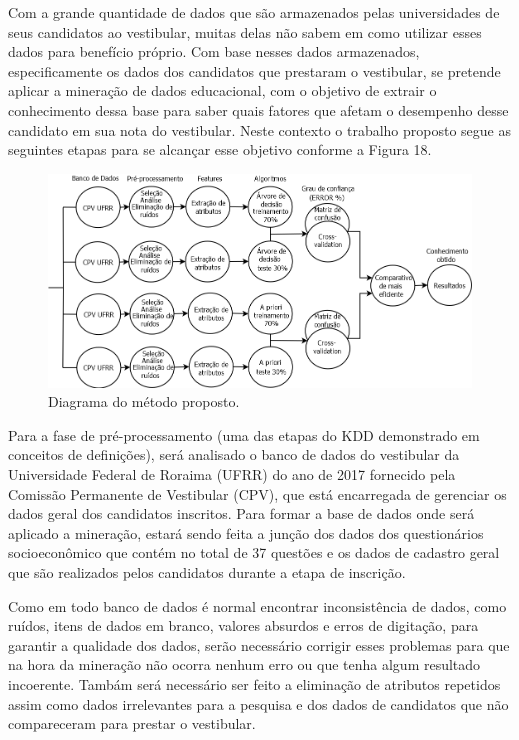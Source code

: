 \label{chapter:metodo}

\par
Com a grande quantidade de dados que são armazenados pelas universidades de seus candidatos ao vestibular, muitas delas não sabem em como utilizar esses dados para benefício próprio. Com base nesses dados armazenados, especificamente os dados dos candidatos que prestaram o vestibular, se pretende aplicar a mineração de dados educacional, com o objetivo de extrair o conhecimento dessa base para saber quais fatores que afetam o desempenho desse candidato em sua nota do vestibular. Neste contexto o trabalho proposto segue as seguintes etapas para se alcançar esse objetivo conforme a Figura 18.

\par
\begin{figure}[!htp]
	\begin{center}
    \caption{\label{fig:waveform_fig} Diagrama do método proposto.}
	\includegraphics[scale=0.45]{Figuras/Caso_de_uso_metodo_TCC1.png}
	\end{center}
\end{figure}

\par
Para a fase de pré-processamento (uma das etapas do KDD demonstrado em conceitos de definições), será analisado o banco de dados do vestibular da Universidade Federal de Roraima (UFRR) do ano de 2017 fornecido pela Comissão Permanente de Vestibular (CPV), que está encarregada de gerenciar os dados geral dos candidatos inscritos. Para formar a base de dados onde será aplicado a mineração, estará sendo feita a junção dos dados dos questionários socioeconômico que contém no total de 37 questões e os dados de cadastro geral que são realizados pelos candidatos durante a etapa de inscrição.


\par
Como em todo banco de dados é normal encontrar inconsistência de dados, como ruídos, itens de dados em branco, valores absurdos e erros de digitação, para garantir a qualidade dos dados, serão necessário corrigir esses problemas para que na hora da mineração não ocorra nenhum erro ou que tenha algum resultado incoerente. Tambám será necessário ser feito a eliminação de atributos repetidos assim como dados irrelevantes para a pesquisa e dos dados de candidatos que não compareceram para prestar o vestibular.

